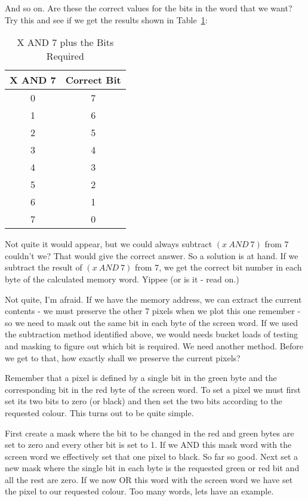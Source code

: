 And so on. Are these the correct values for the bits in the word
    that we want? Try this and see if we get the results shown in Table~\ref{tab:Xand7PlusBitsRequired}:


\begin{table}[htbp]
\centering
\begin{tabular}{c c}
\toprule
\textbf{X AND 7} & \textbf{Correct Bit} \\
\midrule
%
0 & 7 \\
1 & 6 \\
2 & 5 \\
3 & 4 \\
4 & 3 \\
5 & 2 \\
6 & 1 \\
7 & 0 \\
%
\bottomrule
\end{tabular}
\caption{X AND 7 plus the Bits Required}
\label{tab:Xand7PlusBitsRequired}
\end{table}

Not quite it would appear, but we could always subtract $(x~AND~7)$
    from 7 couldn't we? That would give the correct answer. So a solution is
    at hand. If we subtract the result of $(x~AND~7)$ from 7, we get the correct
    bit number in each byte of the calculated memory word. Yippee (or is it -{}
    read on.)

Not quite, I'm afraid. If we have the memory address, we can extract
    the current contents -{} we must preserve the other 7 pixels when we plot
    this one remember -{} so we need to mask out the same bit in each byte of
    the screen word. If we used the subtraction method identified above, we
    would needs bucket loads of testing and masking to figure out which bit is
    required. We need another method. Before we get to that, how exactly shall
    we preserve the current pixels?

Remember that a pixel is defined by a single bit in the green byte
    and the corresponding bit in the red byte of the screen word. To set a
    pixel we must first set its two bits to zero (or black) and then set the
    two bits according to the requested colour. This turns out to be quite
    simple.

First create a mask where the bit to be changed in the red and green
    bytes are set to zero and every other bit is set to 1. If we AND this mask
    word with the screen word we effectively set that one pixel to black. So
    far so good. Next set a new mask where the single bit in each byte is the
    requested green or red bit and all the rest are zero. If we now OR this
    word with the screen word we have set the pixel to our requested colour.
    Too many words, lets have an example.

